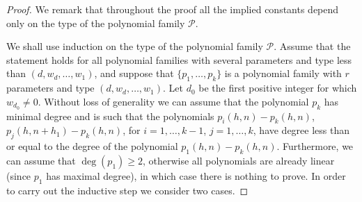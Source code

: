 \documentclass[11pt]{amsart}
\theoremstyle{plain}
\theoremstyle{definition}
\theoremstyle{remark}
\begin{document}
\begin{proof}
We remark that  throughout the proof all the implied constants depend only on the type of
  the polynomial family  $\mathcal{P}$.

  We shall use  induction on the type of the polynomial family $\mathcal{P}$.
  Assume that the statement holds for all polynomial families with several parameters
   and
  type less than $(d,w_d,\ldots,w_1)$, and suppose that $\{p_1,\ldots,p_k\}$ is
  a polynomial family with $r$ parameters and type $(d,w_d,\ldots,w_1)$.
   Let  $d_0$ be
  the first positive integer for which $w_{d_0}\neq 0$.
  Without loss of generality we can assume that the polynomial $p_k$
  has minimal degree and is such that  the polynomials
 $p_i(h,n)-p_k(h,n)$, $p_j(h,n+h_{1})-p_k(h,n)$,
 for  $i=1,\ldots,k-1$, $j=1,\ldots,k$, have degree less than or equal
  to the
 degree of the polynomial $p_1(h,n)-p_k(h,n)$.
 Furthermore, we can assume that $\deg(p_1)\geq
  2$, otherwise all polynomials are already linear (since $p_1$ has
  maximal degree), in which case there is nothing to prove. In order to
  carry out the inductive step we consider two cases.



\end{proof}
\end{document}
